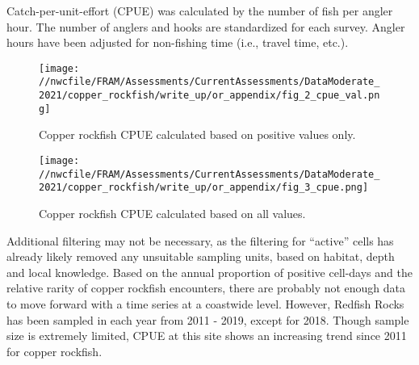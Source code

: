 \documentclass[11pt,
  english,
  a4paper,
]{article}
\begin{document}

Catch-per-unit-effort (CPUE) was calculated by the number of fish per angler hour. The number of anglers and hooks are standardized for each survey. Angler hours have been adjusted for non-fishing time (i.e., travel time, etc.).

\leavevmode\tagmcend\tagstructend\par


\begin{figure}
\centering
\texttt{[image: //nwcfile/FRAM/Assessments/CurrentAssessments/DataModerate\_2021/copper\_rockfish/write\_up/or\_appendix/fig\_2\_cpue\_val.png]}
\caption{Copper rockfish CPUE calculated based on positive values only.\label{fig:fig-2}}
\end{figure}

\tagmcend\tagstructend


\begin{figure}
\centering
\texttt{[image: //nwcfile/FRAM/Assessments/CurrentAssessments/DataModerate\_2021/copper\_rockfish/write\_up/or\_appendix/fig\_3\_cpue.png]}
\caption{Copper rockfish CPUE calculated based on all values.\label{fig:fig-3}}
\end{figure}

\tagmcend\tagstructend


Additional filtering may not be necessary, as the filtering for ``active'' cells has already likely removed any unsuitable sampling units, based on habitat, depth and local knowledge. Based on the annual proportion of positive cell-days and the relative rarity of copper rockfish encounters, there are probably not enough data to move forward with a time series at a coastwide level. However, Redfish Rocks has been sampled in each year from 2011 - 2019, except for 2018. Though sample size is extremely limited, CPUE at this site shows an increasing trend since 2011 for copper rockfish.

\leavevmode\tagmcend\tagstructend\par

\end{document}
